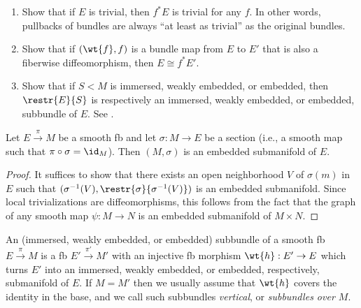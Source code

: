 \begin{xca}\label{example 2.7.3 RS1}
\begin{enumerate}
    \item Show that if $E$ is trivial, then $f^\ast E$ is trivial for any $f$. In other words, pullbacks of bundles are always ``at least as trivial'' as the original bundles.
    \item Show that if $(\wt{f},f)$ is a bundle map from $E$ to $E'$ that is also a fiberwise diffeomorphism, then $E\cong f^\ast E'$.
    \item Show that if $S<M$ is immersed, weakly embedded, or embedded, then $\restr{E}{S}$ is respectively an immersed, weakly embedded, or embedded, subbundle of $E$. See \cite[Example~2.7.3]{RS1}.
\end{enumerate}
\end{xca}



\begin{prop}
    Let $E\overset{\pi}{\to}M$ be a smooth \gls{fb} and let $\sigma:M\to E$ be a section (i.e., a smooth map such that $\pi\circ\sigma=\id_M$). Then $(M,\sigma)$ is an embedded submanifold of $E$.
\end{prop}
\begin{proof}
    It suffices to show that there exists an open neighborhood $V$ of $\sigma(m)$ in $E$ such that $(\sigma^{-1}(V),\restr{\sigma}{\sigma^{-1}(V)})$ is an embedded submanifold. Since local trivializations are diffeomorphisms, this follows from the fact that the graph of any smooth map $\psi:M\to N$ is an embedded submanifold of $M\times N$.
\end{proof}



\begin{defn}
    An (immersed, weakly embedded, or embedded) subbundle of a smooth \gls{fb} $E\overset{\pi}{\to}M$ is a \gls{fb} $E'\overset{\pi'}{\to}M'$ with an injective \gls{fb} morphism $\wt{h}:E'\to E$ which turns $E'$ into an immersed, weakly embedded, or embedded, respectively, submanifold of $E$. If $M=M'$ then we usually assume that $\wt{h}$ covers the identity in the base, and we call such subbundles \emph{vertical}, or \emph{subbundles over $M$}. 
\end{defn}

